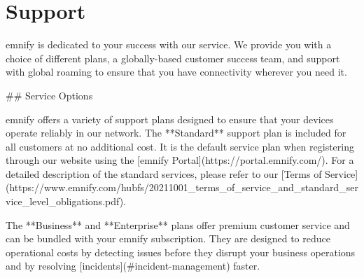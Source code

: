 \documentclass[11pt, oneside]{article}   	%
\begin{document}
\pagebreak[4]

\section{Support}

\begin{markdown}

emnify is dedicated to your success with our service.
We provide you with a choice of different plans, a globally-based customer success team, and support with global roaming to ensure that you have connectivity wherever you need it.

## Service Options

emnify offers a variety of support plans designed to ensure that your devices operate reliably in our network.
The **Standard** support plan is included for all customers at no additional cost.
It is the default service plan when registering through our website using the [emnify Portal](https://portal.emnify.com/).
For a detailed description of the standard services, please refer to our [Terms of Service](https://www.emnify.com/hubfs/20211001_terms_of_service_and_standard_service_level_obligations.pdf).

The **Business** and **Enterprise** plans offer premium customer service and can be bundled with your emnify subscription.
They are designed to reduce operational costs by detecting issues before they disrupt your business operations and by resolving [incidents](#incident-management) faster.

\end{markdown}
\end{document}

